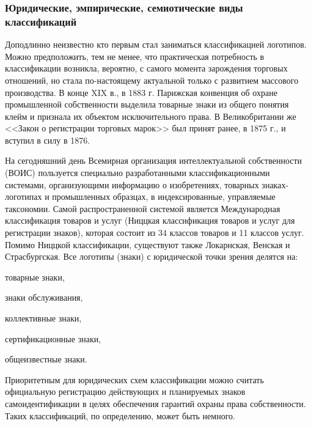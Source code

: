 \subsubsection{Юридические, эмпирические, семиотические виды классификаций}

Доподлинно неизвестно кто первым стал заниматься классификацией логотипов. Можно предположить, тем
не менее, что практическая потребность в классификации возникла, вероятно, с самого момента
зарождения торговых отношений, но стала по-настоящему актуальной только с развитием массового
производства. В конце XIX в., в 1883 г. Парижская конвенция об охране промышленной собственности
выделила товарные знаки из общего понятия клейм и признала их объектом исключительного права. В
Великобритании же <<Закон о регистрации торговых марок>> был принят ранее, в 1875 г., и вступил в силу
в 1876.

На сегодняшний день Всемирная организация интеллектуальной собственности (ВОИС) пользуется
специально разработанными классификационными системами, организующими информацию о изобретениях,
товарных знаках-логотипах и промышленных образцах, в индексированные, управляемые
таксономии. \autocite{vois} Самой распространенной системой является
Международная классификация товаров и услуг (Ниццкая классификация товаров и услуг для регистрации
знаков), которая состоит из 34 классов товаров и 11 классов услуг. Помимо Ниццкой
классификации, существуют также Локарнская, Венская и Страсбургская. Все логотипы (знаки) с
юридической точки зрения делятся на:
\begin{enumerate*}[label=\arabic*)]
\item товарные знаки,
\item знаки обслуживания,
\item коллективные знаки,
\item сертификационные знаки,
\item общеизвестные знаки.
\end{enumerate*}

Приоритетным для юридических схем классификации можно считать официальную регистрацию действующих и
планируемых знаков самоидентификации в целях обеспечения гарантий охраны права собственности. Таких
классификаций, по определению, может быть немного.

